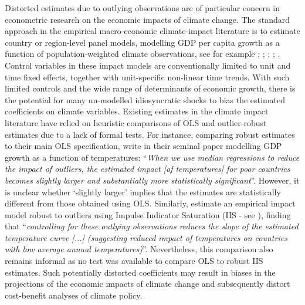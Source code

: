 \documentclass[11pt, letterpaper]{article}
\numberwithin{algorithm}{section}
\numberwithin{assumption}{section}
\numberwithin{lemma}{section}
\numberwithin{theorem}{section}
\numberwithin{corollary}{section}
\numberwithin{remark}{section}
\numberwithin{equation}{section}
\numberwithin{figure}{section}
\numberwithin{table}{section}
\begin{document}
Distorted estimates due to outlying observations are of particular concern in econometric research on the economic impacts of climate change. The standard approach in the empirical macro-economic climate-impact literature is to estimate country or region-level panel models, modelling GDP per capita growth as a function of population-weighted climate observations, see for example \cite{dell2012temperature}; \cite{burke2015global}; \cite{pretis2018uncertain}; \cite{kalkuhl2020impact}; \cite{newell2021gdp}. Control variables in these impact models are conventionally limited to unit and time fixed effects, together with unit-specific non-linear time trends. With such limited controls and the wide range of determinants of economic growth, there is the potential for many un-modelled idiosyncratic shocks to bias the estimated coefficients on climate variables. Existing estimates in the climate impact literature have relied on heuristic comparisons of OLS and outlier-robust estimates due to a lack of formal tests. For instance, comparing robust estimates to their main OLS specification, \cite{dell2012temperature} write in their seminal paper modelling GDP growth as a function of temperatures: ``\emph{When we use median regressions to reduce the impact of outliers, the estimated impact [of temperatures] for poor countries becomes slightly larger and substantially more statistically significant}''. However, it is unclear whether `slightly larger' implies that the estimates are statistically different from those obtained using OLS. Similarly, \cite{pretis2018uncertain} estimate an empirical impact model robust to outliers using Impulse Indicator Saturation (IIS - see \citealt{hendry2008automatic}), finding that ``\emph{controlling for these outlying observations reduces the slope of the estimated temperature curve [...] (suggesting reduced impact of temperatures on countries with low average annual temperatures)}''. Nevertheless, this comparison also remains informal as no test was available to compare OLS to robust IIS estimates. Such potentially distorted coefficients may result in biases in the projections of the economic impacts of climate change and subsequently distort cost-benefit analyses of climate policy.
\end{document}
